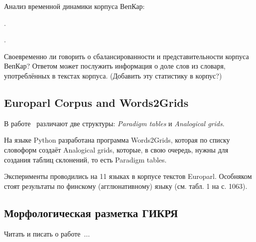 \bigskip

Анализ временной динамики корпуса ВепКар: 

.

.

\bigskip

Своевременно ли говорить о сбалансированности и представительности корпуса ВепКар? 
Ответом может послужить информация о доле слов из словаря, употреблённых в текстах корпуса. 
(Добавить эту статистику в корпус?)



\subsection{Europarl Corpus and Words2Grids}

В работе~\cite{Fam2018tools} различают две структуры: \emph{Paradigm tables} 
и \emph{Analogical grids}. 

На языке Python разработана программа Words2Grids, которая по списку словоформ 
создаёт Analogical grids, которые, в свою очередь, нужны для создания 
таблиц склонений, то есть Paradigm tables.

Эксперименты проводились на 11 языках в корпусе текстов Europarl. 
Особняком стоят результаты по финскому (агглюнативному) языку (см. табл. 1 на с. 1063).


\subsection{Морфологическая разметка ГИКРЯ}

Читать и писать о работе~\cite{Selegey2016}...
